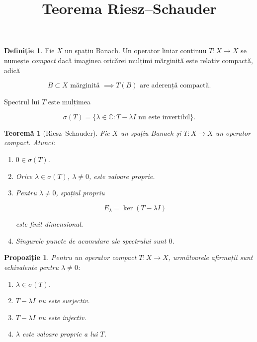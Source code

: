 \documentclass[12pt]{article}
\title{Teorema Riesz--Schauder}
\author{}
\date{}
\theoremstyle{definition}
\newtheorem{definition}{Definiție}
\theoremstyle{plain}
\newtheorem{theorem}{Teoremă}
\newtheorem{proposition}{Propoziție}
\begin{document}
\maketitle

\begin{definition}
Fie $X$ un spațiu Banach. Un operator liniar continuu $T : X \to X$ se numește \emph{compact} dacă imaginea oricărei mulțimi mărginită este relativ compactă, adică


\[
B \subset X \text{ mărginită } \implies T(B) \text{ are aderență compactă}.
\]


Spectrul lui $T$ este mulțimea


\[
\sigma(T) = \{ \lambda \in \mathbb{C} : T - \lambda I \text{ nu este invertibil} \}.
\]


\end{definition}

\begin{theorem}[Riesz--Schauder]
Fie $X$ un spațiu Banach și $T : X \to X$ un operator compact. Atunci:
\begin{enumerate}
    \item[(i)] $0 \in \sigma(T)$.
    \item[(ii)] Orice $\lambda \in \sigma(T)$, $\lambda \ne 0$, este valoare proprie.
    \item[(iii)] Pentru $\lambda \ne 0$, spațiul propriu
    

\[
    E_\lambda = \ker(T - \lambda I)
    \]


    este finit dimensional.
    \item[(iv)] Singurele puncte de acumulare ale spectrului sunt $0$.
\end{enumerate}
\end{theorem}

\begin{proposition}
Pentru un operator compact $T : X \to X$, următoarele afirmații sunt echivalente pentru $\lambda \ne 0$:
\begin{enumerate}
    \item[(i)] $\lambda \in \sigma(T)$.
    \item[(ii)] $T - \lambda I$ nu este surjectiv.
    \item[(iii)] $T - \lambda I$ nu este injectiv.
    \item[(iv)] $\lambda$ este valoare proprie a lui $T$.
\end{enumerate}
\end{proposition}
\end{document}
